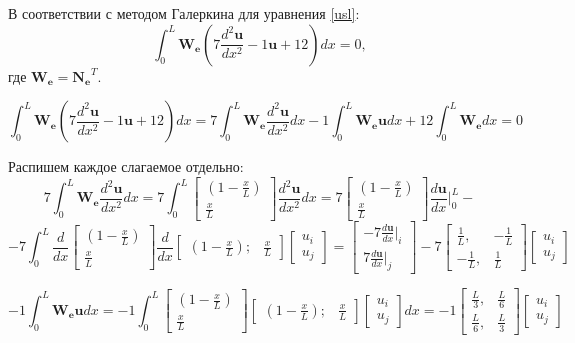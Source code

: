 В соответствии с методом Галеркина для уравнения \ref{usl}:
\begin{equation}\label{lin}
\int_0^L \mathbf{W_e}\left( 7\frac{d^2\mathbf{u}}{dx^2}   -1 \mathbf{u}     +12 \right) d x=0,
\end{equation}
где $\mathbf{W_e=N_e}^T$.

$$\int_0^L \mathbf{W_e}\left(7\frac{d^2\mathbf{u}}{dx^2}   -1 \mathbf{u}     +12 \right) d x= 7\int_0^L \mathbf{W_e} \frac{d^2 \mathbf{u}}{dx^2} dx    -1 \int_0^L \mathbf{W_e} \mathbf{u} d x     +12 \int_0^L \mathbf{W_e} d x=0$$

Распишем каждое слагаемое отдельно:
$$
7\int_0^L \mathbf{W_e} \frac{d^2 \mathbf{u}}{dx^2} dx=7\int_0^L
	\begin{bmatrix}
	(1-\frac{x}{L}) \\
	\frac{x}{L}
	\end{bmatrix}
\frac{d^2 \mathbf{u}}{dx^2} dx =
7
	\begin{bmatrix}
	(1-\frac{x}{L}) \\
	\frac{x}{L}
	\end{bmatrix}
\frac{d\mathbf{u}}{dx} |_0^L -
$$
$$
  -7  \int_0^L
\frac{d}{dx}
	\begin{bmatrix}
	(1-\frac{x}{L}) \\
	\frac{x}{L}
	\end{bmatrix}
\frac{d}{dx}
	\begin{bmatrix}
	(1-\frac{x}{L}); & \frac{x}{L}
	\end{bmatrix}
	\begin{bmatrix}
	u_i \\
	u_j
	\end{bmatrix}
=
	\begin{bmatrix}
	  -7 \frac{d\mathbf{u}}{dx}|_i \\
7\frac{d\mathbf{u}}{dx}|_j
	\end{bmatrix}   -7 
\begin{bmatrix}
\frac{1}{L}, & -\frac{1}{L} \\
-\frac{1}{L}, & \frac{1}{L}
\end{bmatrix}
\begin{bmatrix}
u_i \\
u_j
\end{bmatrix}
$$




$$  -1  
\int_0^L \mathbf{W_e} \mathbf{u} d x=
 -1  
\int_0^L \begin{bmatrix}
(1-\frac{x}{L}) \\
\frac{x}{L}
\end{bmatrix} \begin{bmatrix}
(1-\frac{x}{L}) ; & \frac{x}{L}
\end{bmatrix}\begin{bmatrix}
u_i \\
u_j
\end{bmatrix} d x=
 -1  
\begin{bmatrix}
\frac{L}{3}, & \frac{L}{6} \\
\frac{L}{6}, & \frac{L}{3}
\end{bmatrix}
\begin{bmatrix}
u_i \\
u_j
\end{bmatrix}
$$


